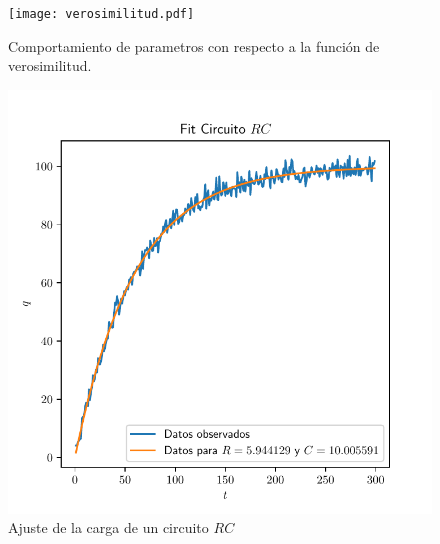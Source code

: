 \documentclass[a4paper]{article}
\begin{document}
	\begin{figure}
		\texttt{[image: verosimilitud.pdf]}
		\caption{Comportamiento de parametros con respecto a la funci\'on de verosimilitud.}
		\label{fig:verosimilitud}
	\end{figure}

	\begin{figure} 
		\includegraphics{best_fit.pdf}
		\caption{Ajuste de la carga de un circuito $RC$}
		\label{fig:ajuste}
	\end{figure}
\end{document}
